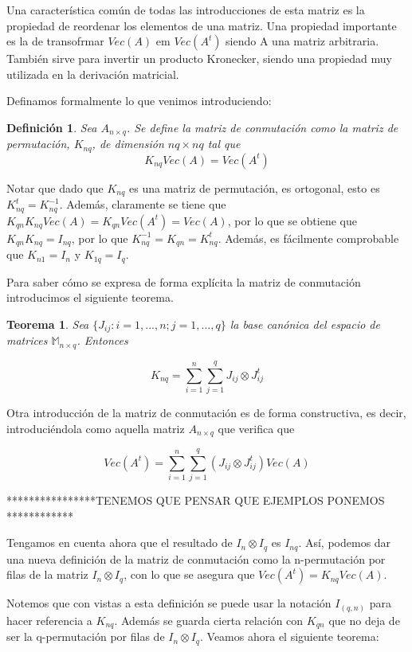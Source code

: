\documentclass{article}
\theoremstyle{theorem-style}  %
\newtheorem{theorem}{Teorema}[section]  %
\theoremstyle{definition-style}
\newtheorem{definition}{Definición}[section]
\theoremstyle{example-style}
\theoremstyle{exercise-style}
\begin{document}
Una característica común de todas las introducciones de esta matriz es la propiedad de reordenar los 
elementos de una matriz. Una propiedad importante es la de transofrmar $Vec(A)$ em $Vec(A^t)$ siendo A una matriz arbitraria. También sirve para invertir un producto Kronecker, siendo una propiedad muy utilizada en la derivación matricial.

Definamos formalmente lo que venimos introduciendo:

\begin{definition}	
	Sea $A_{n \times q}$. Se define la matriz de conmutación como la matriz de permutación, $K_{nq}$, de dimensión $nq \times nq$ tal que $$K_{nq}Vec(A) = Vec(A^t)$$
	
\end{definition}


Notar que dado que $K_{nq}$ es una matriz de permutación, es ortogonal, esto es $K_{nq}^t = K_{nq}^{-1}$. Además, claramente se tiene que $K_{qn}K_{nq} Vec(A) = K_{qn} Vec(A^t) = Vec(A)$, por lo que se obtiene que $K_{qn} K_{nq} = I_{nq}$, por lo que $K_{nq}^{-1} = K_{qn} = K_{nq}^t$. Además, es fácilmente comprobable que $K_{n1} = I_n$ y $K_{1q} = I_q$.

Para saber cómo se expresa de forma explícita la matriz de conmutación introducimos el siguiente teorema.

\begin{theorem}
	\textit{Sea $\{J_{ij}: i = 1, ..., n; j = 1,..., q\}$ la base canónica del espacio de matrices $\mathbb{M}_{n \times q}$. Entonces}
	
	$$K_{nq} = \sum_{i=1}^{n} \sum_{j=1}^{q} J_{ij} \otimes J_{ij}^t$$
\end{theorem}

Otra introducción de la matriz de conmutación es de forma constructiva, es decir, introduciéndola como aquella matriz $A_{n \times q}$ que verifica que

$$
	Vec(A^t) = \sum_{i=1}^{n} \sum_{j=1}^{q}(J_{ij} \otimes J_{ij}^t) Vec(A)
$$

****************TENEMOS QUE PENSAR QUE EJEMPLOS PONEMOS ************

Tengamos en cuenta ahora que el resultado de $I_n \otimes I_q$ es $I_{nq}$. Así, podemos dar una nueva definición de la matriz de conmutación como la n-permutación por filas de la matriz $I_n \otimes I_q$, con lo que se asegura que  $Vec(A^t)= K_{nq}Vec(A)$.

Notemos que con vistas a esta definición se puede usar la notación $I_{(q,n)}$ para hacer referencia a $K_{nq}$. Además se guarda cierta relación con $K_{qn}$ que no deja de ser la q-permutación por filas de $I_n \otimes I_q$. Veamos ahora el siguiente teorema:
\end{document}
